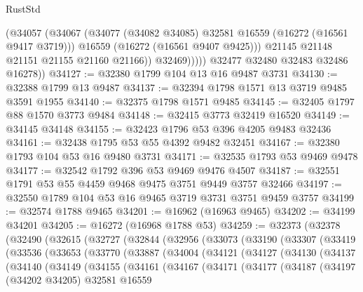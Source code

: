 \begin{lexlean}{RustStd}
\begin{coremodule}
                    (@34057
                      (@34067
                        (@34077 (@34082 @34085) @32581 @16559 (@16272 (@16561 @9417 @3719)))
                        @16559
                        (@16272 (@16561 @9407 @9425)))
                      @21145
                      @21148
                      @21151
                      @21155
                      @21160
                      @21166))
                  @32469)))))
        @32477
        @32480
        @32483
        @32486
        @16278))
@34127 := @32380 @1799 @104 @13 @16 @9487 @3731
@34130 := @32388 @1799 @13 @9487
@34137 := @32394 @1798 @1571 @13 @3719 @9485 @3591 @1955
@34140 := @32375 @1798 @1571 @9485
@34145 := @32405 @1797 @88 @1570 @3773 @9484
@34148 := @32415 @3773 @32419 @16520
@34149 := @34145 @34148
@34155 := @32423 @1796 @53 @396 @4205 @9483 @32436
@34161 := @32438 @1795 @53 @55 @4392 @9482 @32451
@34167 := @32380 @1793 @104 @53 @16 @9480 @3731
@34171 := @32535 @1793 @53 @9469 @9478
@34177 := @32542 @1792 @396 @53 @9469 @9476 @4507
@34187 := @32551 @1791 @53 @55 @4459 @9468 @9475 @3751 @9449 @3757 @32466
@34197 := @32550 @1789 @104 @53 @16 @9465 @3719 @3731 @3751 @9459 @3757
@34199 := @32574 @1788 @9465
@34201 := @16962 (@16963 @9465)
@34202 := @34199 @34201
@34205 := @16272 (@16968 @1788 @53)
@34259 := @32373
    (@32378
      (@32490
        (@32615
          (@32727
            (@32844
              (@32956
                (@33073
                  (@33190
                    (@33307
                      (@33419
                        (@33536
                          (@33653
                            (@33770
                              (@33887
                                (@34004
                                  (@34121
                                    (@34127
                                      (@34130
                                        (@34137
                                          (@34140
                                            (@34149
                                              (@34155
                                                (@34161
                                                  (@34167
                                                    (@34171
                                                      (@34177
                                                        (@34187
                                                          (@34197
                                                            (@34202 @34205)
                                                            @32581
                                                            @16559

\end{coremodule}
\end{lexlean}
